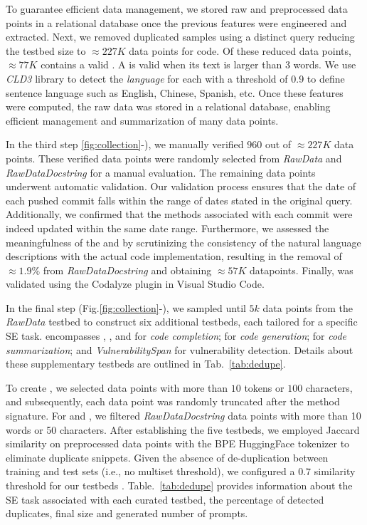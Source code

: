 To guarantee efficient data management, we stored raw and preprocessed data points in a relational database once the previous features were engineered and extracted. Next, we removed duplicated samples using a distinct query reducing the testbed size to $\approx 227K$ data points for code. Of these reduced data points, $\approx 77K$ contains a valid \docstring. A \docstring is valid when its text is larger than 3 words. We use \textit{CLD3} library to detect the \textit{language} for each \docstring with a threshold of 0.9 to define sentence language such as English, Chinese, Spanish, etc.
Once these features were computed, the raw data was stored in a relational database, enabling efficient management and summarization of many data points.


In the third step \ref{fig:collection}-), we manually verified $960$ out of $\approx 227K$ data points. These verified data points were randomly selected from \textit{RawData} and \textit{RawDataDocstring} for a manual evaluation. The remaining data points underwent automatic validation. Our validation process ensures that the date of each pushed commit falls within the range of dates stated in the original query. Additionally, we confirmed that the methods associated with each commit were indeed updated within the same date range. Furthermore, we assessed the meaningfulness of the \docstring and \commitMessage by scrutinizing the consistency of the natural language descriptions with the actual code implementation, resulting in the removal of $\approx1.9\%$ from \textit{RawDataDocstring} and obtaining $\approx57K$ datapoints. Finally, \complexity was validated using the Codalyze plugin in Visual Studio Code.

In the final step (Fig.\ref{fig:collection}-), we sampled until $5k$ data points from the \textit{RawData} testbed to construct six additional testbeds, each tailored for a specific SE task. \snipgen encompasses \randomCut, \withDocstring, and \fromDocstring for \textit{code completion}; \commitGen for \textit{code generation}; \summarizationGen for \textit{code summarization}; and \textit{VulnerabilitySpan} for vulnerability detection. Details about these supplementary testbeds are outlined in Tab.~\ref{tab:dedupe}.

To create \randomCut, we selected data points with more than $10$ tokens or $100$ characters, and subsequently, each data point was randomly truncated after the method signature. For \summarizationGen and \commitGen, we filtered \textit{RawDataDocstring} data points with more than 10 words or 50 characters. After establishing the five testbeds, we employed Jaccard similarity on preprocessed data points with the BPE HuggingFace tokenizer to eliminate duplicate snippets. Given the absence of de-duplication between training and test sets (i.e., no multiset threshold), we configured a $0.7$ similarity threshold for our testbeds \cite{Allamanis19, wang_neural_2019}. Table.~\ref{tab:dedupe} provides information about the SE task associated with each curated testbed, the percentage of detected duplicates, final size and generated number of prompts.




